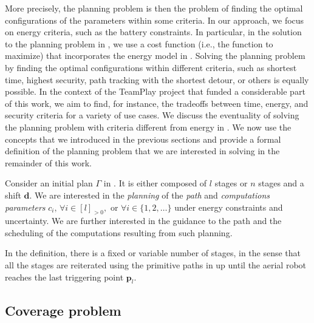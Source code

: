 More precisely, the planning problem is then the problem of finding the optimal configurations of the parameters within some criteria. In our approach, we focus on energy criteria, such as the battery constraints. In particular, in the solution to the planning problem in , we use a cost function (i.e., the function to maximize) that incorporates the energy model in . Solving the planning problem by finding the optimal configurations within different criteria, such as shortest time, highest security, path tracking with the shortest detour, or others is equally possible. In the context of the TeamPlay project that funded a considerable part of this work, we aim to find, for instance, the tradeoffs between time, energy, and security criteria for a variety of use cases. We discuss the eventuality of solving the planning problem with criteria different from energy in . We now use the concepts that we introduced in the previous sections and provide a formal definition of the planning problem that we are interested in solving in the remainder of this work.

\begin{pb}
  \label{pb}
  Consider an initial plan $\Gamma$ in . It is either composed of $l$ stages or $n$ stages and a shift $\mathbf{d}$. We are interested in the \emph{planning} of the \emph{path} and \emph{computations parameters} $c_i,\,\forall i\in[l]_{>0},$ or $\forall i\in\{1,2,\dots\}$ under energy constraints and uncertainty.
  We are further interested in the guidance to the path and the scheduling of the computations resulting from such planning.
\end{pb}    

In the definition, there is a fixed or variable number of stages, in the sense that all the stages are reiterated using the primitive paths in  up until the aerial robot reaches the last triggering point $\mathbf{p}_l$.

\subsection{Coverage problem}

